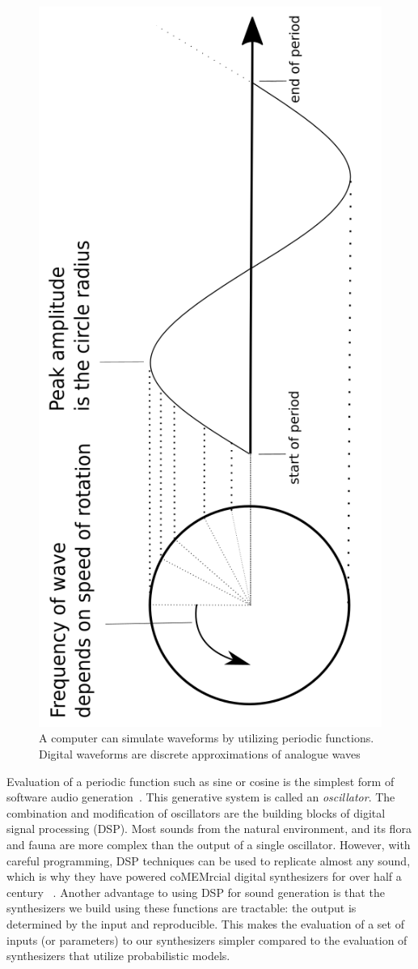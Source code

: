 \documentclass[runningheads,a4paper]{llncs}
\begin{document}
\begin{figure}[htbp]
\label{fig_example_sine}
\centering
\includegraphics[width=0.45\linewidth,angle =-90 ]{images/periodic_function.png}
\caption{A computer can simulate waveforms by utilizing periodic functions. Digital waveforms are discrete approximations of analogue waves~\cite{mitchell2009basicsynthChap5} }
\end{figure}

Evaluation of a periodic function such as sine or cosine is the simplest form of software audio generation~\cite{mitchell2009basicsynthChap5}. This generative system is called an \textit{oscillator}. The combination and modification of oscillators are the building blocks of digital signal processing (DSP). Most sounds from the natural environment, and its flora and fauna are more complex than the output of a single oscillator. However, with careful programming, DSP techniques can be used to replicate almost any sound, which is why they have powered coMEMrcial digital synthesizers for over half a century ~\cite{jenkins2019analog}. Another advantage to using DSP for sound generation is that the synthesizers we build using these functions are tractable: the output is determined by the input and reproducible. This makes the evaluation of a set of inputs (or parameters) to our synthesizers  simpler compared to the evaluation of synthesizers that utilize probabilistic models.
 
\end{document}
